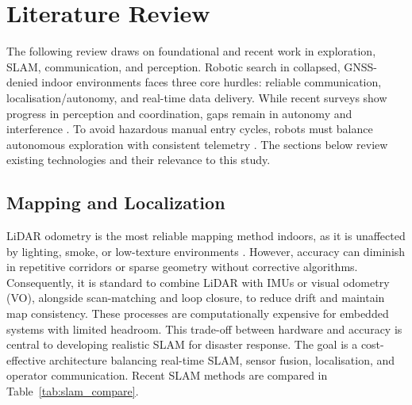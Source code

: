 
\chapter{Literature Review}
\label{ch:lit}

The following review draws on foundational and recent work in exploration, SLAM, communication, and perception. Robotic search in collapsed, GNSS-denied indoor environments faces three core hurdles: reliable communication, localisation/autonomy, and real-time data delivery. While recent surveys show progress in perception and coordination, gaps remain in autonomy and interference \cite{queralta2020}. To avoid hazardous manual entry cycles, robots must balance autonomous exploration with consistent telemetry \cite{lu2022}. The sections below review existing technologies and their relevance to this study.

\section{Mapping and Localization}
\label{sec:lit_mapping}

LiDAR odometry is the most reliable mapping method indoors, as it is unaffected by lighting, smoke, or low-texture environments \cite{lee2024}. However, accuracy can diminish in repetitive corridors or sparse geometry without corrective algorithms. Consequently, it is standard to combine LiDAR with IMUs or visual odometry (VO), alongside scan-matching and loop closure, to reduce drift and maintain map consistency. These processes are computationally expensive for embedded systems with limited headroom. This trade-off between hardware and accuracy is central to developing realistic SLAM for disaster response. The goal is a cost-effective architecture balancing real-time SLAM, sensor fusion, localisation, and operator communication. Recent SLAM methods are compared in Table~\ref{tab:slam_compare}.

